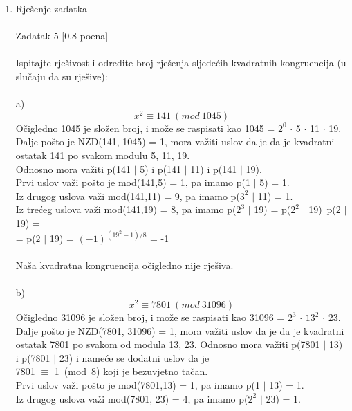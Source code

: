 \documentclass[12pt]{article}
\begin{document}
\begin{enumerate}
		\item Rješenje zadatka \\
		\\
		Zadatak 5 [0.8 poena] \\
		\\
		Ispitajte rješivost i odredite broj rješenja sljedećih kvadratnih kongruencija (u slučaju da su
        rješive): \\
        \\
		a)\\
		\begin{equation*}
	       x^2 \equiv 141~(mod~1045)
		\end{equation*}
		Očigledno 1045 je složen broj, i može se raspisati kao 1045 = $2^0$ ${\cdot}$ 5 ${\cdot}$ 11 ${\cdot}$ 19.
		Dalje pošto je NZD(141, 1045) = 1, mora važiti uslov da je  da je kvadratni 
		ostatak 141 po svakom modulu 5, 11, 19. \\
		Odnosno mora važiti p(141 $\mid$ 5) i p(141 $\mid$ 11) i p(141 $\mid$ 19). \\
		Prvi uslov važi pošto je mod(141,5) = 1, pa imamo p(1 $\mid$ 5) = 1. \\
		Iz drugog uslova važi mod(141,11) = 9, pa imamo p($3^2$ $\mid$ 11) = 1. \\
		Iz trećeg uslova važi mod(141,19) = 8, pa imamo p($2^3$ $\mid$ 19) = 
		p($2^2$ $\mid$ 19)~p($2$ $\mid$ 19) = \\ 
		=  p($2$ $\mid$ 19) = $(-1)^{(19^2 -1)/ 8}$ =  -1 \\
		\\
		Naša kvadratna kongruencija očigledno nije rješiva. \\
		\\
		b)
		\begin{equation*}
	       x^2 \equiv 7801~(mod~31096)
		\end{equation*}
		Očigledno 31096 je složen broj, i može se raspisati kao 31096 = $2^3$ ${\cdot}$ $13^2$ ${\cdot}$ 23.
		Dalje pošto je NZD(7801, 31096) = 1, mora važiti uslov da je  da je kvadratni 
		ostatak 7801 po svakom od modula 13, 23.
		\newpage
		Odnosno mora važiti p(7801 $\mid$ 13) i p(7801 $\mid$ 23) i nameće se dodatni uslov da je  \\
		7801 ${\equiv}$ 1~(mod~8) koji je bezuvjetno tačan. \\
		Prvi uslov važi pošto je mod(7801,13) = 1, pa imamo p(1 $\mid$ 13) = 1. \\
		Iz drugog uslova važi mod(7801, 23) = 4, pa imamo p($2^2$ $\mid$ 23) = 1. \\

\end{enumerate}
\end{document}
